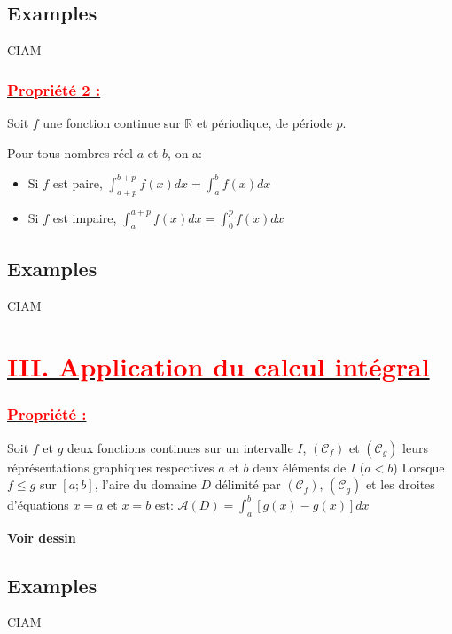 \documentclass[12pt]{article}
\begin{document}
\subsection*{Examples}
CIAM
\subsubsection*{\underline{\textcolor{red}{Propriété 2 :}}}
Soit \(f\) une fonction continue sur \( \mathbb{R} \) et périodique, de période \(p\).

Pour tous nombres réel \(a\) et \(b\), on a:

\begin{itemize}
    \item Si \(f\) est paire, \( \int_{a+p}^{b+p}f(x)dx = \int_{a}^{b}f(x)dx \)
    \item Si \(f\) est impaire, \( \int_{a}^{a+p}f(x)dx =  \int_{0}^{p}f(x)dx \)
\end{itemize}
\subsection*{Examples}
CIAM
\section*{\underline{\textbf{\textcolor{red}{III. Application du calcul intégral}}}}
\subsubsection*{\underline{\textcolor{red}{Propriété :}}}
Soit \(f\) et \(g\) deux fonctions continues sur un intervalle \(I\), \( (\mathcal{C}_f) \) et \( (\mathcal{C}_g) \) leurs réprésentations graphiques respectives \(a\) et \(b\) deux éléments de \(I\) (\(a<b\))
Lorsque \(f \leq g\) sur \( [a;b] \), l'aire du domaine \(D\) délimité par \( (\mathcal{C}_f) \), \( (\mathcal{C}_g) \) et les droites d'équations \( x=a \) et \( x=b \) est: \(\mathcal{A}(D)=\int_{a}^{b} [g(x)-g(x)]dx \)

\textbf{Voir dessin}
\subsection*{Examples}
CIAM
\end{document}
